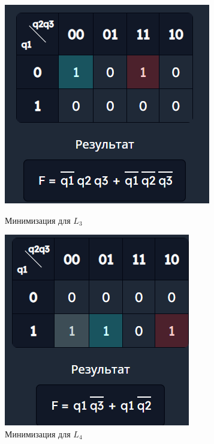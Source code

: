 \documentclass[11pt,a4paper,final]{article} %
\begin{document}
\newpage

\begin{figure}[ht]
	\centering
	\begin{minipage}{0.45\textwidth}
		\centering
		\includegraphics[width=\linewidth]{img/L3.png}
		\caption{Минимизация для $L_3$}
		\label{fig:L3}
	\end{minipage}\hfill
	\begin{minipage}{0.45\textwidth}
		\centering
		\includegraphics[width=\linewidth]{img/L4.png}
		\caption{Минимизация для $L_4$}
		\label{fig:L4}
	\end{minipage}
	

\end{figure}
\end{document}
